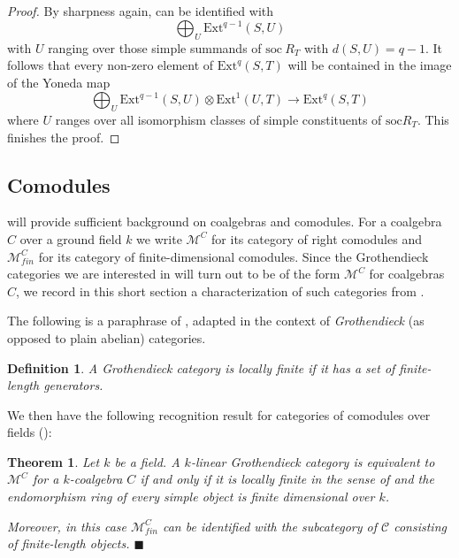 \documentclass[11pt]{article}
\theoremstyle{plain}
\newtheorem{theorem}[lemma]{Theorem}
\theoremstyle{nonumberplain}
\theoremstyle{plain}
\newtheorem{definition}[lemma]{Definition}
\numberwithin{equation}{section}
\theoremstyle{nonumberplain}
\newtheorem{proof}{Proof}
\newcommand\cC{{\mathcal C}}
\newcommand\cM{{\mathcal M}}
\newcommand\1{{\bf 1}}
\newcommand{\qedhere}{\mbox{}\hfill\ensuremath{\blacksquare}}
\begin{document}
\begin{proof}
  By sharpness again,  can be identified with
  \begin{equation*}
    \bigoplus_{U}\mathrm{Ext}^{q-1}(S,U)
  \end{equation*}
  with $U$ ranging over those simple summands of $\mathrm{soc}~R_T$ with $d(S,U)=q-1$. It follows that every non-zero element of $\mathrm{Ext}^q(S,T)$ will be contained in the image of the Yoneda map
  \begin{equation*}
    \bigoplus_{U}\mathrm{Ext}^{q-1}(S,U)\otimes \mathrm{Ext}^1(U,T)\to \mathrm{Ext}^q(S,T)
  \end{equation*}
  where $U$ ranges over all isomorphism classes of simple constituents of $\mathrm{soc}R_T$. This finishes the proof.
\end{proof}


\subsection{Comodules}\label{subse:comodules}

\cite[Chapters I and II]{Sweedler} will provide sufficient background on coalgebras and comodules. For a coalgebra $C$ over a ground field $k$ we write $\cM^C$ for its category of right comodules and $\cM^C_{fin}$ for its category of finite-dimensional comodules. Since the Grothendieck categories we are interested in will turn out to be of the form $\cM^C$ for coalgebras $C$, we record in this short section a characterization of such categories from \cite{Tak77}.

The following is a paraphrase of \cite[Definition 4.1]{Tak77}, adapted in the context of {\it Grothendieck} (as opposed to plain abelian) categories.

\begin{definition}\label{def:loc-fin}
  A Grothendieck category is {\it locally finite} if it has a set of finite-length generators. 
\end{definition}

We then have the following recognition result for categories of comodules over fields (\cite[Theorem 5.1]{Tak77}):

\begin{theorem}\label{thm:tak}
  Let $k$ be a field. A $k$-linear Grothendieck category is equivalent to $\cM^C$ for a $k$-coalgebra $C$ if and only if it is locally finite in the sense of  and the endomorphism ring of every simple object is finite dimensional over $k$.

  Moreover, in this case $\cM^C_{fin}$ can be identified with the subcategory of $\cC$ consisting of finite-length objects.
  \qedhere
\end{theorem}
\end{document}
